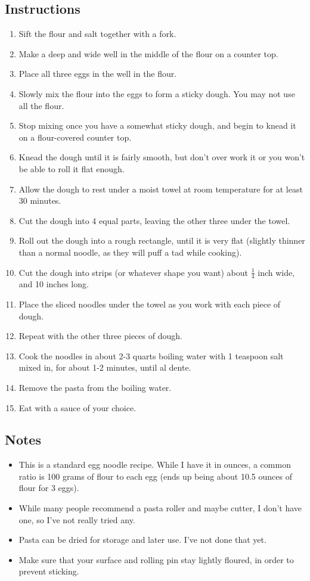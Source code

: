 \begin{multicols}{2}
\subsection*{Instructions}
\begin{enumerate}
    \item Sift the flour and salt together with a fork.
    \item Make a deep and wide well in the middle of the flour on a counter top.
    \item Place all three eggs in the well in the flour.
    \item Slowly mix the flour into the eggs to form a sticky dough. You may not use all the flour.
    \item Stop mixing once you have a somewhat sticky dough, and begin to knead it on a flour-covered counter top.
    \item Knead the dough until it is fairly smooth, but don't over work it or you won't be able to roll it flat enough.
    \item Allow the dough to rest under a moist towel at room temperature for at least 30 minutes.
    \item Cut the dough into 4 equal parts, leaving the other three under the towel.
    \item Roll out the dough into a rough rectangle, until it is very flat (slightly thinner than a normal noodle, as they will puff a tad while cooking).
    \item Cut the dough into strips (or whatever shape you want) about \( \frac{1}{4} \) inch wide, and 10 inches long.
    \item Place the sliced noodles under the towel as you work with each piece of dough.
    \item Repeat with the other three pieces of dough.
    \item Cook the noodles in about 2-3 quarts boiling water with 1 teaspoon salt mixed in, for about 1-2 minutes, until al dente.
    \item Remove the pasta from the boiling water.
    \item Eat with a sauce of your choice.
\end{enumerate}

\subsection*{Notes}
\begin{itemize}
    \item This is a standard egg noodle recipe. While I have it in ounces, a common ratio is 100 grams of flour to each egg (ends up being about 10.5 ounces of flour for 3 eggs).
    \item While many people recommend a pasta roller and maybe cutter, I don't have one, so I've not really tried any.
    \item Pasta can be dried for storage and later use. I've not done that yet.
    \item Make sure that your surface and rolling pin stay lightly floured, in order to prevent sticking.
\end{itemize}
\end{multicols}
\clearpage